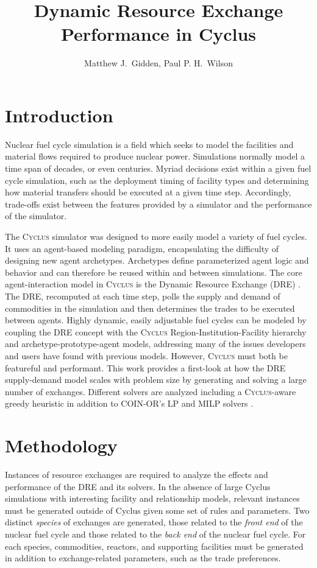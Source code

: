 \documentclass{anstrans}
\title{Dynamic Resource Exchange Performance in Cyclus}
\author{Matthew J.~Gidden, Paul P. H.~Wilson}
\institute{
University of Wisconsin, Madison WI
}
\newcommand{\Cyclus}{\textsc{Cyclus}}
\begin{document}
\section{Introduction}

Nuclear fuel cycle simulation is a field which seeks to model the facilities and
material flows required to produce nuclear power. Simulations normally model a
time span of decades, or even centuries. Myriad decisions exist within a given
fuel cycle simulation, such as the deployment timing of facility types and
determining how material transfers should be executed at a given time
step. Accordingly, trade-offs exist between the features provided by a simulator
and the performance of the simulator.

The \Cyclus{} simulator \cite{cyclus2014} was designed to more easily model a
variety of fuel cycles. It uses an agent-based modeling paradigm, encapsulating
the difficulty of designing new agent archetypes. Archetypes define
parameterized agent logic and behavior and can therefore be reused within and
between simulations. The core agent-interaction model in \Cyclus{} is the
Dynamic Resource Exchange (DRE) \cite{gidden_agent-based_2013,
  gidden_agent-based_2014}. The DRE, recomputed at each time step, polls the
supply and demand of commodities in the simulation and then determines the
trades to be executed between agents. Highly dynamic, easily adjustable fuel
cycles can be modeled by coupling the DRE concept with the \Cyclus{}
Region-Institution-Facility hierarchy and archetype-prototype-agent models,
addressing many of the issues developers and users have found with previous
models. However, \Cyclus{} must both be featureful and performant. This work
provides a first-look at how the DRE supply-demand model scales with problem
size by generating and solving a large number of exchanges. Different solvers
are analyzed including a \Cyclus{}-aware greedy heuristic in addition to
COIN-OR's LP and MILP solvers \cite{coinclp, coincbc}.

\section{Methodology}

Instances of resource exchanges are required to analyze the effects and
performance of the DRE and its solvers. In the absence of large Cyclus
simulations with interesting facility and relationship models, relevant
instances must be generated outside of Cyclus given some set of rules and
parameters. Two distinct \textit{species} of exchanges are generated, those
related to the \textit{front end} of the nuclear fuel cycle and those related to
the \textit{back end} of the nuclear fuel cycle. For each species, commodities,
reactors, and supporting facilities must be generated in addition to
exchange-related parameters, such as the trade preferences.
\end{document}
